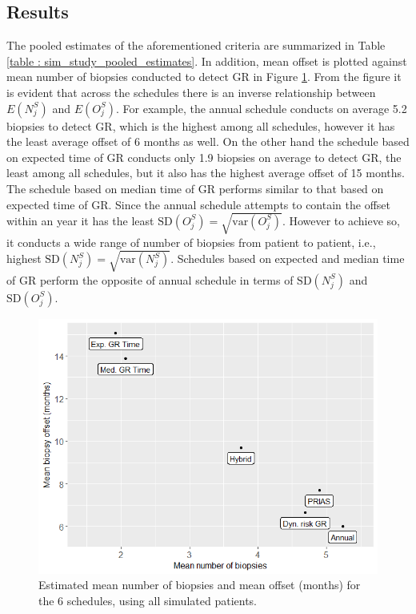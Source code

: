 \subsection{Results}
The pooled estimates of the aforementioned criteria are summarized in Table \ref{table : sim_study_pooled_estimates}. In addition, mean offset is plotted against mean number of biopsies conducted to detect GR in Figure \ref{fig : meanNbVsOffset}. From the figure it is evident that across the schedules there is an inverse relationship between $E(N^S_j)$ and $E(O^S_j)$. For example, the annual schedule conducts on average 5.2 biopsies to detect GR, which is the highest among all schedules, however it has the least average offset of 6 months as well. On the other hand the schedule based on expected time of GR conducts only 1.9 biopsies on average to detect GR, the least among all schedules, but it also has the highest average offset of 15 months. The schedule based on median time of GR performs similar to that based on expected time of GR. Since the annual schedule attempts to contain the offset within an year it has the least $\mbox{SD}(O^S_j) = \sqrt{\mbox{var}(O^S_j)}$. However to achieve so, it conducts a wide range of number of biopsies from patient to patient, i.e., highest $\mbox{SD}(N^S_j) = \sqrt{\mbox{var}(N^S_j)}$. Schedules based on expected and median time of GR perform the opposite of annual schedule in terms of $\mbox{SD}(N^S_j)$ and $\mbox{SD}(O^S_j)$.

\begin{figure}
\centerline{\includegraphics[width=\columnwidth]{images/sim_study/meanNbVsOffset_all.png}}
\caption{Estimated mean number of biopsies and mean offset (months) for the 6 schedules, using all simulated patients.}
\label{fig : meanNbVsOffset}
\end{figure}

